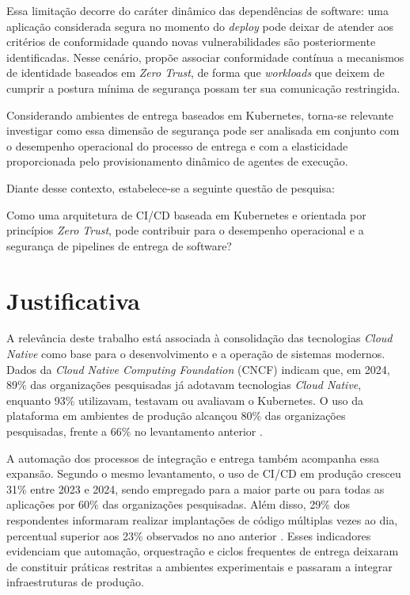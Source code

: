 Essa limitação decorre do caráter dinâmico das dependências de software: uma aplicação
considerada segura no momento do \textit{deploy} pode deixar de atender aos critérios de
conformidade quando novas vulnerabilidades são posteriormente identificadas. Nesse cenário,
 propõe associar conformidade contínua a mecanismos de identidade
baseados em \textit{Zero Trust}, de forma que \textit{workloads} que deixem de cumprir
a postura mínima de segurança possam ter sua comunicação restringida.

Considerando ambientes de entrega baseados em Kubernetes, torna-se relevante investigar
como essa dimensão de segurança pode ser analisada em conjunto com o desempenho operacional
do processo de entrega e com a elasticidade proporcionada pelo provisionamento dinâmico
de agentes de execução.

Diante desse contexto, estabelece-se a seguinte questão de pesquisa:

\begin{citacao}
Como uma arquitetura de CI/CD baseada em Kubernetes e orientada por princípios \textit{Zero Trust}, pode contribuir para o desempenho operacional e a segurança de pipelines de entrega de software?
\end{citacao}

\section{Justificativa}
\label{sec:justificativa}

A relevância deste trabalho está associada à consolidação das tecnologias \textit{Cloud
Native} como base para o desenvolvimento e a operação de sistemas modernos. Dados da
\textit{Cloud Native Computing Foundation} (CNCF) indicam que, em 2024, 89\% das
organizações pesquisadas já adotavam tecnologias \textit{Cloud Native}, enquanto 93\%
utilizavam, testavam ou avaliavam o Kubernetes. O uso da plataforma em ambientes de
produção alcançou 80\% das organizações pesquisadas, frente a 66\% no levantamento
anterior \cite{cncf2024}.

A automação dos processos de integração e entrega também acompanha essa expansão.
Segundo o mesmo levantamento, o uso de CI/CD em produção cresceu 31\% entre 2023 e
2024, sendo empregado para a maior parte ou para todas as aplicações por 60\% das
organizações pesquisadas. Além disso, 29\% dos respondentes informaram realizar
implantações de código múltiplas vezes ao dia, percentual superior aos 23\% observados
no ano anterior \cite{cncf2024}. Esses indicadores evidenciam que automação,
orquestração e ciclos frequentes de entrega deixaram de constituir práticas restritas a
ambientes experimentais e passaram a integrar infraestruturas de produção.

